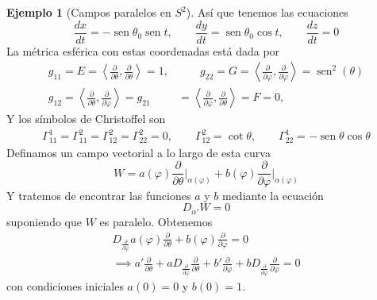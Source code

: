 \documentclass[spanish]{book}
\theoremstyle{definition}
\newtheorem*{ejem}{Ejemplo}
\DeclareMathOperator{\sen}{sen}
\begin{document}
\begin{ejem}[Campos paralelos en $S^2$]
		Así que tenemos las ecuaciones
		\[\frac{dx}{dt}=-\sen\theta_0\sen t,\qquad\frac{dy}{dt}=\sen\theta_0\cos t,\qquad\frac{dz}{dt}=0\]
		La métrica esférica con estas coordenadas está dada por
		\begin{align*}
			g_{11}=E=\left\langle \frac{\partial}{\partial \theta},\frac{\partial}{\partial \theta}\right\rangle=1,&\qquad g_{22}=G=\left\langle \frac{\partial}{\partial \varphi},\frac{\partial}{\partial \varphi}\right\rangle=\sen^2(\theta)\\
			g_{12}=\left\langle \frac{\partial}{\partial \theta},\frac{\partial}{\partial \varphi}\right\rangle=g_{21}&=\left\langle \frac{\partial}{\partial \varphi},\frac{\partial}{\partial \theta}\right\rangle=F=0,
		\end{align*}
		Y los símbolos de Christoffel son
		\begin{align*}
			\Gamma_{11}^1=\Gamma^2_{11}=\Gamma^2_{12}=\Gamma_{22}^2=0,		\qquad \Gamma_{12}^2=\cot\theta,\qquad\Gamma^1_{22}=-\sen\theta\cos\theta
		\end{align*}
		Definamos un campo vectorial a lo largo de esta curva
		\[W=a(\varphi)\frac{\partial}{\partial\theta}\Big|_{\alpha(\varphi)}+b(\varphi)\frac{\partial}{\partial \varphi}\Big|_{\alpha(\varphi)}\]
		Y tratemos de encontrar las funciones $a$ y $b$ mediante la ecuación
		\[D_{\alpha'}W=0\]
		suponiendo que $W$ es paralelo. Obtenemos
		\begin{align*}
			D_{\frac{\partial}{\partial\varphi}}a(\varphi)\frac{\partial}{\partial\theta}+b(\varphi)\frac{\partial}{\partial\varphi}=0\\
			\implies a'\frac{\partial}{\partial\theta}+aD_{\frac{\partial}{\partial \varphi}}\frac{\partial}{\partial \theta}+b'\frac{\partial}{\partial\varphi}+bD_{\frac{\partial}{\partial \varphi}}\frac{\partial}{\partial\varphi}=0
		\end{align*}
		con condiciones iniciales $a(0)=0$ y $b(0)=1$.
		

\end{ejem}
\end{document}
